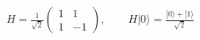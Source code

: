 \documentclass{article}
\begin{document}
$\displaystyle H = \frac{1}{\sqrt{2}}\begin{pmatrix} 1 & 1 \\ 1 & -1 \end{pmatrix}, \qquad H|0\rangle = \frac{|0\rangle + |1\rangle}{\sqrt{2}}$
\end{document}

